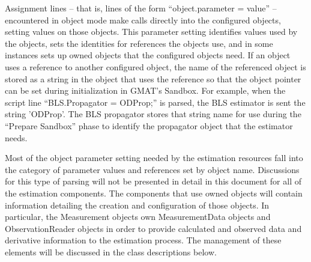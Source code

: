 Assignment lines -- that is, lines of the form ``object.parameter = value'' -- encountered in object
mode make calls directly into the configured objects, setting values on those objects.  This
parameter setting identifies values used by the objects, sets the identities for references the
objects use, and in some instances sets up owned objects that the configured objects need.  If an
object uses a reference to another configured object, the name of the referenced object is stored as
a string in the object that uses the reference so that the object pointer can be set during
initialization in GMAT's Sandbox.  For example, when the script line ``BLS.Propagator = ODProp;'' is
parsed, the BLS estimator is sent the string 'ODProp'.  The BLS propagator stores that string name
for use during the ``Prepare Sandbox'' phase to identify the propagator object that the estimator
needs.

Most of the object parameter setting needed by the estimation resources fall into the category of
parameter values and references set by object name.  Discussions for this type of parsing will not
be presented in detail in this document for all of the estimation components.  The components that
use owned objects will contain information detailing the creation and configuration of those
objects.  In particular, the Measurement objects own MeasurementData objects and ObservationReader
objects in order to provide calculated and observed data and derivative information to the
estimation process.  The management of these elements will be discussed in the class descriptions
below.

